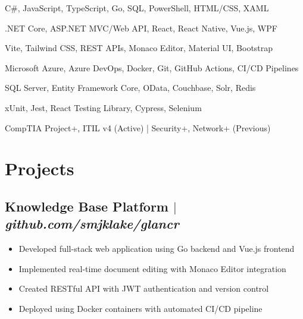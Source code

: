 \documentclass[11pt]{article} %
\begin{document}
\begin{description}[itemsep=0pt]
	\item[Languages] C\#, JavaScript, TypeScript, Go, SQL, PowerShell, HTML/CSS, XAML
	\item[Frameworks] .NET Core, ASP.NET MVC/Web API, React, React Native, Vue.js, WPF
	\item[Frontend] Vite, Tailwind CSS, REST APIs, Monaco Editor, Material UI, Bootstrap
	\item[Cloud/DevOps] Microsoft Azure, Azure DevOps, Docker, Git, GitHub Actions, CI/CD Pipelines
	\item[Data \& Storage] SQL Server, Entity Framework Core, OData, Couchbase, Solr, Redis
	\item[Testing] xUnit, Jest, React Testing Library, Cypress, Selenium
	\item[Certifications] CompTIA Project+, ITIL v4 (Active) | Security+, Network+ (Previous)
\end{description}

\section{Projects}
\subsection{Knowledge Base Platform $|$ \normalfont\textit{github.com/smjklake/glancr}}
\begin{itemize}
  \item Developed full-stack web application using Go backend and Vue.js frontend
  \item Implemented real-time document editing with Monaco Editor integration
  \item Created RESTful API with JWT authentication and version control
  \item Deployed using Docker containers with automated CI/CD pipeline
\end{itemize}
\end{document}
